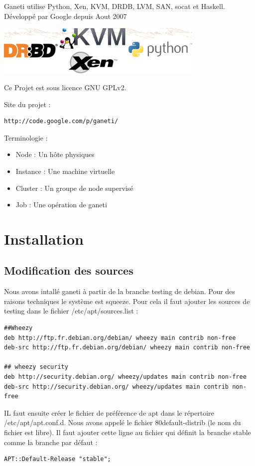 Ganeti utilise Python, Xen, KVM, DRDB, LVM, SAN, socat et Haskell.
Développé par Google depuis Aout 2007

\includegraphics[width=10cm]{images/image1.png}

Ce Projet est sous licence GNU GPLv2.

Site du projet :
\begin{lstlisting}
http://code.google.com/p/ganeti/
\end{lstlisting}

Terminologie :
\begin{itemize}
\item Node : Un hôte physiques
\item Instance : Une machine virtuelle
\item Cluster : Un groupe de node supervisé
\item Job : Une opération de ganeti
\end{itemize}

\section {Installation}
\subsection {Modification des sources}
Nous avons intallé ganeti à partir de la branche testing de debian. Pour des raisons techniques le système est squeeze. Pour cela il faut ajouter les sources de testing dans le fichier /etc/apt/sources.list :
\begin{lstlisting}
##Wheezy
deb http://ftp.fr.debian.org/debian/ wheezy main contrib non-free
deb-src http://ftp.fr.debian.org/debian/ wheezy main contrib non-free

## wheezy security
deb http://security.debian.org/ wheezy/updates main contrib non-free
deb-src http://security.debian.org/ wheezy/updates main contrib non-free
\end{lstlisting}

IL faut ensuite créer le fichier de préférence de apt dans le répertoire /etc/apt/apt.conf.d. Nous avons appelé le fichier 80default-distrib (le nom du fichier est libre). Il faut ajouter cette ligne au fichier qui définit la branche stable comme la branche par défaut :
\begin{lstlisting}
APT::Default-Release "stable";
\end{lstlisting}

